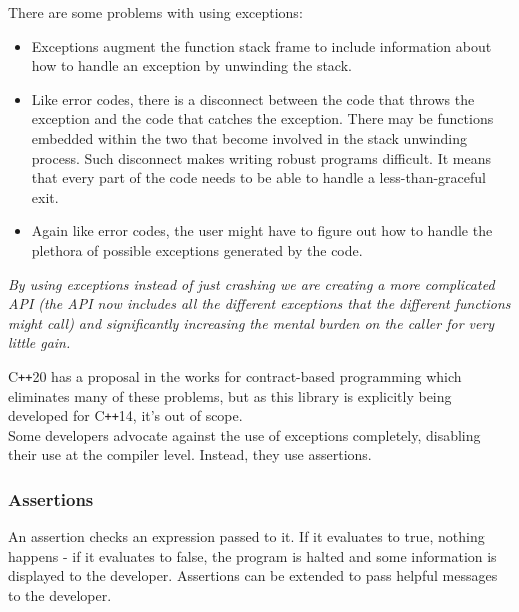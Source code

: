 \documentclass[12pt]{report}
\newcommand{\citenoparen}[1]{\citeauthor{#1} \citeyear{#1}}
\newcommand{\cpp}{C\texttt{++}}
\newcommand{\quotebu}[2]
{
  \begin{displayquote}[\citenoparen{#2}]
    \textit{#1}
  \end{displayquote}
}
\theoremstyle{definition}
\begin{document}
          There are some problems with using exceptions:

          \begin{itemize}
            \item Exceptions augment the function stack frame to include
              information about how to handle an exception by unwinding the stack.
            \item Like error codes, there is a disconnect between the code
              that throws the exception and the code that catches the exception.
              There may be functions embedded within the two that become
              involved in the stack unwinding process. Such disconnect makes
              writing robust programs difficult. It means that every part of
              the code needs to be able to handle a less-than-graceful exit.
            \item Again like error codes, the user might have to figure out
              how to handle the plethora of possible exceptions generated by
              the code.
          \end{itemize}

          \quotebu{
            By using exceptions instead of just crashing we are creating a more
            complicated API (the API now includes all the different exceptions
            that the different functions might call) and significantly
            increasing the mental burden on the caller for very little gain.
          }{gamasutra}

          \cpp20 has a proposal in the works for contract-based programming
          which eliminates many of these problems, but as this library is
          explicitly being developed for \cpp14, it's out of scope. \\

          Some developers advocate against the use of exceptions completely,
          disabling their use at the compiler level. Instead, they use
          assertions.

        \subsubsection{Assertions}

          An assertion checks an expression passed to it. If it evaluates to
          true, nothing happens - if it evaluates to false, the program is
          halted and some information is displayed to the developer.
          Assertions can be extended to pass helpful messages to the
          developer. \\
\end{document}
